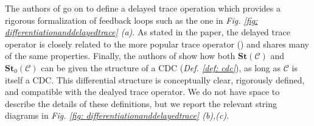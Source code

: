 \documentclass[11pt,a4paper,openright,twoside]{report}
\theoremstyle{plain}
\theoremstyle{definition}
\begin{document}
The authors of \cite{sprunger2019differentiable} go on to define a delayed trace operation which provides a rigorous formalization of feedback loops such as the one in \textit{Fig. \ref{fig: differentiationanddelayedtrace} (a)}. As stated in the paper, the delayed trace operator is closely related to the more popular trace operator (\cite{joyal1996traced}) and shares many of the same properties. 
Finally, the authors of \cite{sprunger2019differentiable} show how both $\mathbf{St}(\mathcal{C})$ and $\mathbf{St}_0(\mathcal{C})$ can be given the structure of a CDC (\textit{Def. \ref{def: cdc}}), as long as $\mathcal{C}$ is itself a CDC. This differential structure is conceptually clear, rigorously defined, and compatible with the dealyed trace operator. We do not have space to describe the details of these definitions, but we report the relevant string diagrams in \textit{Fig. \ref{fig: differentiationanddelayedtrace} (b),(c)}.
\end{document}
